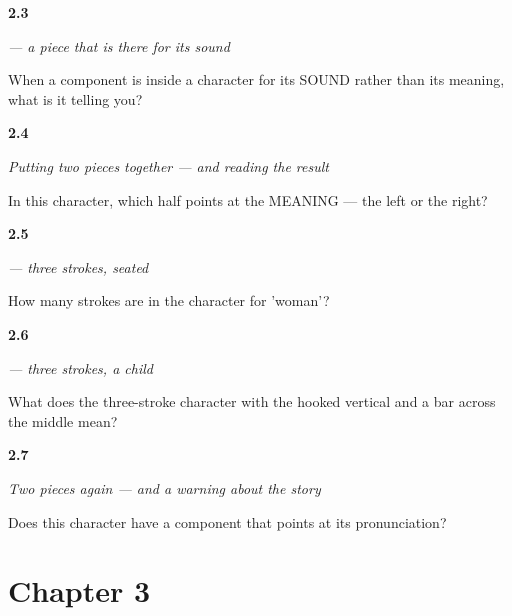 \noindent\begin{minipage}[t]{\linewidth}
\raggedright
\hypertarget{review-ZH-W01-er-role}{\textbf{2.3}} \emph{ — a piece that is there for its sound}\par
\small When a component is inside a character for its SOUND rather than its meaning, what is it telling you?
\end{minipage}\par\medskip

\noindent\begin{minipage}[t]{\linewidth}
\raggedright
\hypertarget{review-ZH-W01-ni-build-halves}{\textbf{2.4}} \emph{Putting two pieces together — and reading the result}\par
\small In this character, which half points at the MEANING — the left or the right?
\end{minipage}\par\medskip

\noindent\begin{minipage}[t]{\linewidth}
\raggedright
\hypertarget{review-ZH-W01-nu-strokes}{\textbf{2.5}} \emph{ — three strokes, seated}\par
\small How many strokes are in the character for 'woman'?
\end{minipage}\par\medskip

\noindent\begin{minipage}[t]{\linewidth}
\raggedright
\hypertarget{review-ZH-W01-zi-meaning}{\textbf{2.6}} \emph{ — three strokes, a child}\par
\small What does the three-stroke character with the hooked vertical and a bar across the middle mean?
\end{minipage}\par\medskip

\noindent\begin{minipage}[t]{\linewidth}
\raggedright
\hypertarget{review-ZH-W01-hao-build-halves}{\textbf{2.7}} \emph{Two pieces again — and a warning about the story}\par
\small Does this character have a component that points at its pronunciation?
\end{minipage}\par\medskip

\section*{Chapter 3}

